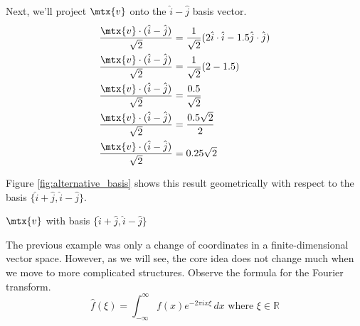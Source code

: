Next, we'll project $\mtx{v}$ onto the $\hat{i} - \hat{j}$ basis vector.
\begin{align*}
  \frac{\mtx{v} \cdot (\hat{i} - \hat{j})}{\sqrt{2}} &=
    \frac{1}{\sqrt{2}} (2\hat{i} \cdot \hat{i} - 1.5\hat{j} \cdot \hat{j}) \\
  \frac{\mtx{v} \cdot (\hat{i} - \hat{j})}{\sqrt{2}} &=
    \frac{1}{\sqrt{2}} (2 - 1.5) \\
  \frac{\mtx{v} \cdot (\hat{i} - \hat{j})}{\sqrt{2}} &= \frac{0.5}{\sqrt{2}} \\
  \frac{\mtx{v} \cdot (\hat{i} - \hat{j})}{\sqrt{2}} &= \frac{0.5\sqrt{2}}{2} \\
  \frac{\mtx{v} \cdot (\hat{i} - \hat{j})}{\sqrt{2}} &= 0.25\sqrt{2}
\end{align*}

Figure \ref{fig:alternative_basis} shows this result geometrically with respect
to the basis $\{\hat{i} + \hat{j}, \hat{i} - \hat{j}\}$.
\begin{bookfigure}

  \caption{$\mtx{v}$ with basis $\{\hat{i} + \hat{j}, \hat{i} - \hat{j}\}$}
  \label{fig:alternative_basis}
\end{bookfigure}

The previous example was only a change of coordinates in a finite-dimensional
vector space. However, as we will see, the core idea does not change much when
we move to more complicated structures. Observe the formula for the Fourier
transform.
\begin{equation*}
  \hat{f}(\xi) = \int_{-\infty}^\infty f(x) e^{-2\pi ix \xi} \,dx
    \text{ where } \xi \in \mathbb{R}
\end{equation*}

